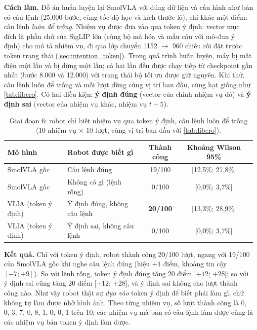 \documentclass[a4paper,oneside]{report}
\begin{document}
\textbf{Cách làm.} Đồ án huấn luyện lại SmolVLA với đúng dữ liệu và cấu hình như bản có câu lệnh (25.000 bước, cùng tốc độ học và kích thước lô), chỉ khác một điểm: câu lệnh \textit{luôn để trống}. Nhiệm vụ được đưa vào qua token ý định: vector mục đích là phần chữ của SigLIP lớn (cùng bộ mã hóa và mẫu câu với mô-đun ý định) cho mô tả nhiệm vụ, đi qua lớp chuyển 1152 $\rightarrow$ 960 chiều rồi đặt trước token trạng thái (\cref{sec:intention_token}). Trong quá trình huấn luyện, máy bị mất điện một lần và bị dừng một lần; cả hai lần đều được chạy tiếp từ checkpoint gần nhất (bước 8.000 và 12.000) với trạng thái bộ tối ưu được giữ nguyên. Khi thử, câu lệnh luôn để trống và mỗi lượt dùng cùng vị trí ban đầu, cùng hạt giống như \cref{tab:libero}. Có hai điều kiện: \textbf{ý định đúng} (vector của chính nhiệm vụ đó) và \textbf{ý định sai} (vector của nhiệm vụ khác, nhiệm vụ $t+5$).

\begin{table}[ht]
\centering
\caption{Giai đoạn 6: robot chỉ biết nhiệm vụ qua token ý định, câu lệnh luôn để trống (10 nhiệm vụ $\times$ 10 lượt, cùng vị trí ban đầu với \cref{tab:libero}).}
\label{tab:intention_only}
\small
\begin{tabular}{llccc}
\toprule
Mô hình & Robot được biết gì & Thành công & Khoảng Wilson 95\% \\
\midrule
SmolVLA gốc & Câu lệnh đúng & 19/100 & [12,5\%; 27,8\%] \\
SmolVLA gốc & Không có gì (lệnh rỗng) & 0/100 & [0,0\%; 3,7\%] \\
\midrule
VLIA (token ý định) & Ý định đúng, không câu lệnh & \textbf{20/100} & [13,3\%; 28,9\%] \\
VLIA (token ý định) & Ý định sai, không câu lệnh & 0/100 & [0,0\%; 3,7\%] \\
\bottomrule
\end{tabular}
\end{table}

\textbf{Kết quả.} Chỉ với token ý định, robot thành công 20/100 lượt, ngang với 19/100 của SmolVLA gốc khi nghe câu lệnh đúng (hiệu $+1$ điểm, khoảng tin cậy $[-7; +9]$). So với lệnh rỗng, token ý định đúng tăng 20 điểm [$+12$; $+28$]; so với ý định sai cũng tăng 20 điểm [$+12$; $+28$], và ý định sai không cho lượt thành công nào. Như vậy robot thật sự \textit{dựa vào} token ý định để biết phải làm gì, chứ không tự làm được nhờ hình ảnh. Theo từng nhiệm vụ, số lượt thành công là 0, 0, 3, 7, 0, 8, 1, 0, 0, 1 trên 10; các nhiệm vụ mà bản có câu lệnh làm được cũng là các nhiệm vụ bản token ý định làm được.
\end{document}
